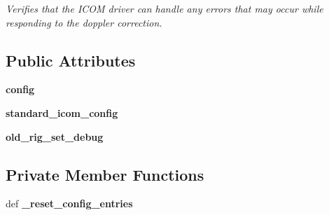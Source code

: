 \begin{DoxyCompactItemize}
\begin{DoxyCompactList}\small\item\em Verifies that the I\-C\-O\-M driver can handle any errors that may occur while responding to the doppler correction. \end{DoxyCompactList}\end{DoxyCompactItemize}
\subsection*{Public Attributes}
\begin{DoxyCompactItemize}
\item 
\hypertarget{classhwm_1_1hardware_1_1devices_1_1drivers_1_1icom__910_1_1tests_1_1test__icom__910_1_1_test_icom910_a3a7ced289674e68d0294dff366e32533}{{\bfseries config}}\label{classhwm_1_1hardware_1_1devices_1_1drivers_1_1icom__910_1_1tests_1_1test__icom__910_1_1_test_icom910_a3a7ced289674e68d0294dff366e32533}

\item 
\hypertarget{classhwm_1_1hardware_1_1devices_1_1drivers_1_1icom__910_1_1tests_1_1test__icom__910_1_1_test_icom910_ad945862570676ffd01848fc0d5c5e635}{{\bfseries standard\-\_\-icom\-\_\-config}}\label{classhwm_1_1hardware_1_1devices_1_1drivers_1_1icom__910_1_1tests_1_1test__icom__910_1_1_test_icom910_ad945862570676ffd01848fc0d5c5e635}

\item 
\hypertarget{classhwm_1_1hardware_1_1devices_1_1drivers_1_1icom__910_1_1tests_1_1test__icom__910_1_1_test_icom910_a050b545f64ca78a3c37520aebc39bd7f}{{\bfseries old\-\_\-rig\-\_\-set\-\_\-debug}}\label{classhwm_1_1hardware_1_1devices_1_1drivers_1_1icom__910_1_1tests_1_1test__icom__910_1_1_test_icom910_a050b545f64ca78a3c37520aebc39bd7f}

\end{DoxyCompactItemize}
\subsection*{Private Member Functions}
\begin{DoxyCompactItemize}
\item 
\hypertarget{classhwm_1_1hardware_1_1devices_1_1drivers_1_1icom__910_1_1tests_1_1test__icom__910_1_1_test_icom910_a209bfc515f28ffa27d6e2255a449da28}{def {\bfseries \-\_\-reset\-\_\-config\-\_\-entries}}\label{classhwm_1_1hardware_1_1devices_1_1drivers_1_1icom__910_1_1tests_1_1test__icom__910_1_1_test_icom910_a209bfc515f28ffa27d6e2255a449da28}

\end{DoxyCompactItemize}


